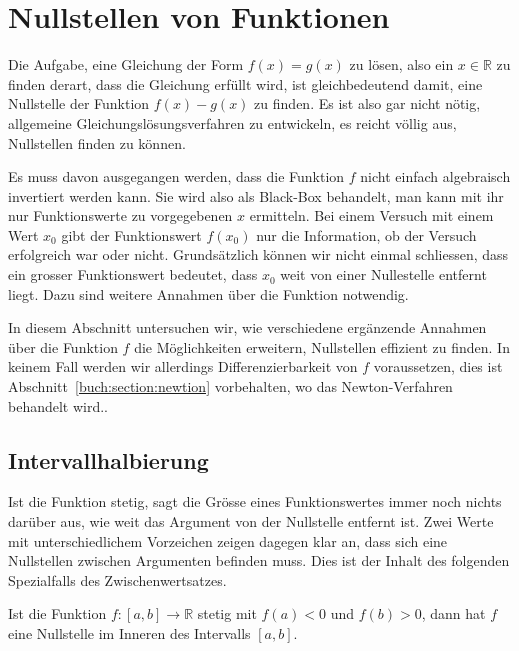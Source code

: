 %
%
%
\section{Nullstellen von Funktionen
\label{buch:section:nullstellen}}
%
Die Aufgabe, eine Gleichung der Form $f(x) = g(x)$
zu lösen, also ein $x\in\mathbb R$ zu finden derart, dass die Gleichung
erfüllt wird, ist gleichbedeutend damit, eine Nullstelle der Funktion
$f(x)-g(x)$ zu finden.
Es ist also gar nicht nötig, allgemeine Gleichungslösungsverfahren zu
entwickeln, es reicht völlig aus, Nullstellen finden zu können.

Es muss davon ausgegangen werden, dass die Funktion $f$ nicht einfach
algebraisch invertiert werden kann.
Sie wird also als Black-Box behandelt, man kann mit ihr nur Funktionswerte
zu vorgegebenen $x$ ermitteln.
%
Bei einem Versuch mit einem Wert $x_0$ gibt der Funktionswert $f(x_0)$
nur die Information, ob der Versuch erfolgreich war oder nicht.
Grundsätzlich können wir nicht einmal schliessen, dass ein
grosser Funktionswert bedeutet, dass $x_0$ weit von einer
Nullestelle entfernt liegt.
Dazu sind weitere Annahmen über die Funktion notwendig.

In diesem Abschnitt untersuchen wir, wie verschiedene ergänzende Annahmen
über die Funktion $f$ die Möglichkeiten erweitern, Nullstellen
effizient zu finden.
In keinem Fall werden wir allerdings Differenzierbarkeit von $f$ voraussetzen,
dies ist Abschnitt~\ref{buch:section:newtion} vorbehalten, wo das
Newton-Verfahren behandelt wird..

%
%
\subsection{Intervallhalbierung
\label{buch:subsection:intervallhalbierung}}
Ist die Funktion stetig, sagt die Grösse eines Funktionswertes immer
noch nichts darüber aus, wie weit das Argument von der Nullstelle
entfernt ist.
Zwei Werte mit unterschiedlichem Vorzeichen zeigen dagegen klar an,
dass sich eine Nullstellen zwischen Argumenten befinden muss.
Dies ist der Inhalt des folgenden Spezialfalls des Zwischenwertsatzes.

\begin{satz}
\label{buch:satz:nullstellenzwsatz}
%
Ist die Funktion $f\colon[a,b]\to\mathbb R$ stetig mit $f(a) <0$ und $f(b)>0$,
dann hat $f$ eine Nullstelle im Inneren des Intervalls $[a,b]$.
\end{satz}

